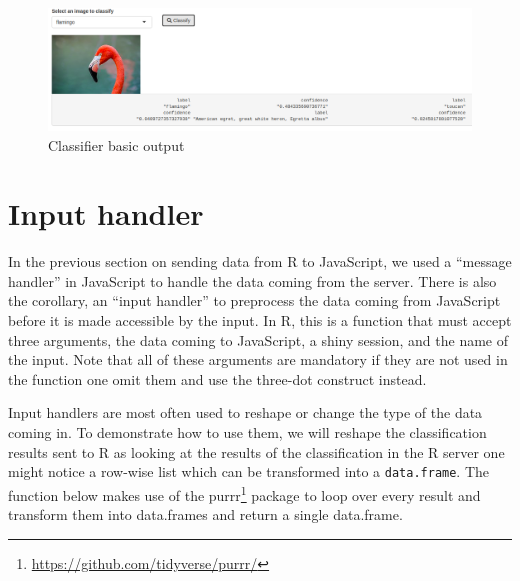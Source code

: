 \documentclass[
]{krantz}
\makeatletter
\newenvironment{Shaded}{\begin{snugshade}}{\end{snugshade}}
\newcommand{\CommentTok}[1]{\textcolor[rgb]{0.37,0.37,0.37}{\textit{#1}}}
\newcommand{\KeywordTok}[1]{\textcolor[rgb]{0.27,0.27,0.27}{\textbf{#1}}}
\newcommand{\NormalTok}[1]{#1}
\newcommand{\OperatorTok}[1]{\textcolor[rgb]{0.43,0.43,0.43}{\textbf{#1}}}
\newcommand{\StringTok}[1]{\textcolor[rgb]{0.5,0.5,0.5}{#1}}
\renewcommand{\href}[2]{#2\footnote{\url{#1}}}
\newenvironment{kframe}{%
\medskip{}
\setlength{\fboxsep}{.8em}
 \def\at@end@of@kframe{}%
 \ifinner\ifhmode%
  \def\at@end@of@kframe{\end{minipage}}%
  \begin{minipage}{\columnwidth}%
 \fi\fi%
 \def\FrameCommand##1{\hskip\@totalleftmargin \hskip-\fboxsep
 \colorbox{shadecolor}{##1}\hskip-\fboxsep
     \hskip-\linewidth \hskip-\@totalleftmargin \hskip\columnwidth}%
 \MakeFramed {\advance\hsize-\width
   \@totalleftmargin\z@ \linewidth\hsize
   \@setminipage}}%
 {\par\unskip\endMakeFramed%
 \at@end@of@kframe}
\renewenvironment{Shaded}{\begin{kframe}}{\end{kframe}}
\makeatother
\begin{document}
\begin{Shaded}
\end{Shaded}

\begin{figure}[t]

{\centering \includegraphics[width=1\linewidth]{images/ml5-output} 

}

\caption{Classifier basic output}\label{fig:shiny-complete-ml5-output}
\end{figure}

\hypertarget{shiny-complete-input-handler}{%
\section{Input handler}\label{shiny-complete-input-handler}}

In the previous section on sending data from R to JavaScript, we used a ``message handler'' in JavaScript to handle the data coming from the server. There is also the corollary, an ``input handler'' to preprocess the data coming from JavaScript before it is made accessible by the input. In R, this is a function that must accept three arguments, the data coming to JavaScript, a shiny session, and the name of the input. Note that all of these arguments are mandatory if they are not used in the function one omit them and use the three-dot construct instead.

Input handlers are most often used to reshape or change the type of the data coming in. To demonstrate how to use them, we will reshape the classification results sent to R as looking at the results of the classification in the R server one might notice a row-wise list which can be transformed into a \texttt{data.frame}. The function below makes use of the \href{https://github.com/tidyverse/purrr/}{purrr} \citep{R-purrr} package to loop over every result and transform them into data.frames and return a single data.frame.
\end{document}
